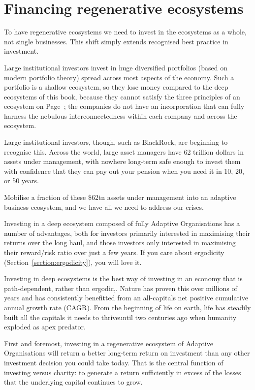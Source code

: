 \section{Financing regenerative ecosystems}
To have regenerative ecosystems we need to invest in the ecosystems as a whole, not single businesses. This shift simply extends recognised best practice in investment. 


Large institutional investors invest in huge diversified portfolios (based on modern portfolio theory) spread across most aspects of the economy. Such a portfolio is a shallow ecosystem, so they lose money compared to the deep ecosystems of this book, because they cannot satisfy the three principles of an ecosystem on Page~\pageref{list:ecosystem-principles}; the companies do not have an incorporation that can fully harness the nebulous interconnectedness within each company and across the ecosystem. 


Large institutional investors, though, such as BlackRock, are beginning to recognise this. Across the world, large asset managers have 62 trillion dollars in assets under management, with nowhere long-term safe enough to invest them with confidence that they can pay out your pension when you need it in 10, 20, or 50 years. 


Mobilise a fraction of these \$62tn assets under management into an adaptive business ecosystem, and we have all we need to address our crises.


Investing in a deep ecosystem composed of fully Adaptive Organisations has a number of advantages, both for investors primarily interested in maximising their returns over the long haul, and those investors only interested in maximising their reward/risk ratio over just a few years.  If you care about ergodicity  (Section~\ref{section:ergodicity}), you will love it.


Investing in deep ecosystems is the best way of investing in an economy that is  path-dependent, rather than ergodic,. Nature has proven this over millions of years and has consistently benefitted from an all-capitals net positive cumulative annual growth rate (CAGR). From the beginning of life on earth, life has steadily built all the capitals  it needs to thrive\textemdash until two centuries ago when humanity exploded as apex predator. 


First and foremost, investing in a regenerative ecosystem of Adaptive Organisations will return a better long-term return on investment than any other investment decision you could take today. That is the central function of investing versus charity: to generate a return sufficiently in excess of the losses that the underlying capital continues to grow.


